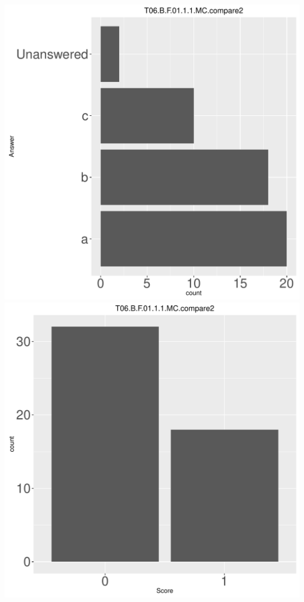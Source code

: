 \documentclass[12pt,english,nohyper]{tufte-handout}\usepackage[]{graphicx}\usepackage[]{color}
\begin{document}
\begin{center} \includegraphics[width=.45\linewidth]{Topic06_AB_18_answer} \includegraphics[width=.45\linewidth]{Topic06_AB_18_score} \end{center} 
\end{document}

